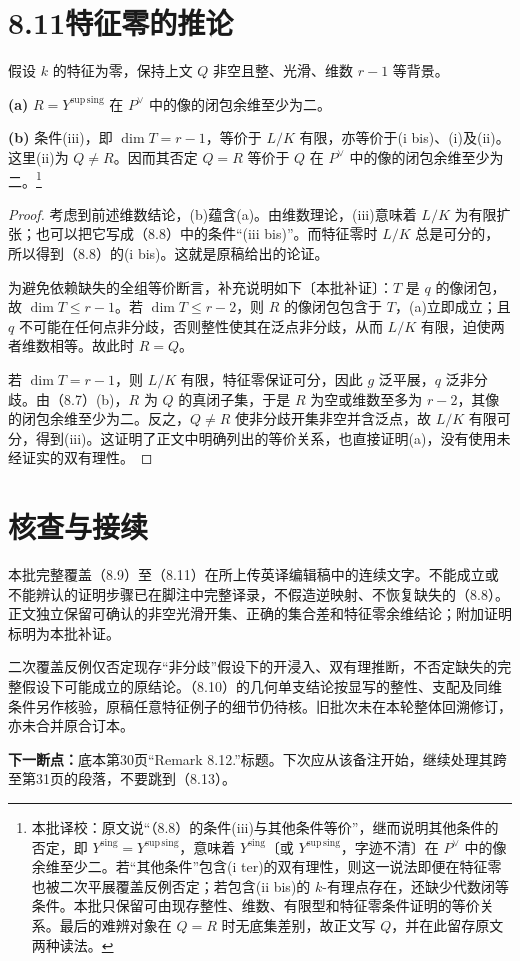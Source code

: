 \documentclass{ctexbook}
\newcommand{\corr}[1]{\footnote{本批译校：#1}}
\newcommand{\Ys}{Y^{\mathrm{sing}}}
\newcommand{\Yss}{Y^{\mathrm{sup\,sing}}}
\begin{document}
\chapter*{8.11\quad 特征零的推论}
假设 $k$ 的特征为零，保持上文 $Q$ 非空且整、光滑、维数 $r-1$ 等背景。

\noindent\textbf{(a)} $R=\Yss$ 在 $P^\vee$ 中的像的闭包余维至少为二。

\noindent\textbf{(b)} 条件(iii)，即 $\dim T=r-1$，等价于 $L/K$ 有限，亦等价于(i bis)、(i)及(ii)。这里(ii)为 $Q\ne R$。因而其否定 $Q=R$ 等价于 $Q$ 在 $P^\vee$ 中的像的闭包余维至少为二。\corr{原文说“（8.8）的条件(iii)与其他条件等价”，继而说明其他条件的否定，即 $\Ys=\Yss$，意味着 $\Ys$〔或 $\Yss$，字迹不清〕在 $P^\vee$ 中的像余维至少二。若“其他条件”包含(i ter)的双有理性，则这一说法即便在特征零也被二次平展覆盖反例否定；若包含(ii bis)的 $k$-有理点存在，还缺少代数闭等条件。本批只保留可由现存整性、维数、有限型和特征零条件证明的等价关系。最后的难辨对象在 $Q=R$ 时无底集差别，故正文写 $Q$，并在此留存原文两种读法。}

\begin{proof}
考虑到前述维数结论，(b)蕴含(a)。由维数理论，(iii)意味着 $L/K$ 为有限扩张；也可以把它写成（8.8）中的条件“(iii bis)”。而特征零时 $L/K$ 总是可分的，所以得到（8.8）的(i bis)。这就是原稿给出的论证。

为避免依赖缺失的全组等价断言，补充说明如下〔本批补证〕：$T$ 是 $q$ 的像闭包，故 $\dim T\leq r-1$。若 $\dim T\leq r-2$，则 $R$ 的像闭包包含于 $T$，(a)立即成立；且 $q$ 不可能在任何点非分歧，否则整性使其在泛点非分歧，从而 $L/K$ 有限，迫使两者维数相等。故此时 $R=Q$。

若 $\dim T=r-1$，则 $L/K$ 有限，特征零保证可分，因此 $g$ 泛平展，$q$ 泛非分歧。由（8.7）(b)，$R$ 为 $Q$ 的真闭子集，于是 $R$ 为空或维数至多为 $r-2$，其像的闭包余维至少为二。反之，$Q\ne R$ 使非分歧开集非空并含泛点，故 $L/K$ 有限可分，得到(iii)。这证明了正文中明确列出的等价关系，也直接证明(a)，没有使用未经证实的双有理性。
\end{proof}
\backmatter
\chapter*{核查与接续}
本批完整覆盖（8.9）至（8.11）在所上传英译编辑稿中的连续文字。不能成立或不能辨认的证明步骤已在脚注中完整译录，不假造逆映射、不恢复缺失的（8.8）。正文独立保留可确认的非空光滑开集、正确的集合差和特征零余维结论；附加证明标明为本批补证。

二次覆盖反例仅否定现存“非分歧”假设下的开浸入、双有理推断，不否定缺失的完整假设下可能成立的原结论。（8.10）的几何单支结论按显写的整性、支配及同维条件另作核验，原稿任意特征例子的细节仍待核。旧批次未在本轮整体回溯修订，亦未合并原合订本。

\textbf{下一断点：}底本第30页“Remark 8.12.”标题。下次应从该备注开始，继续处理其跨至第31页的段落，不要跳到（8.13）。
\end{document}
